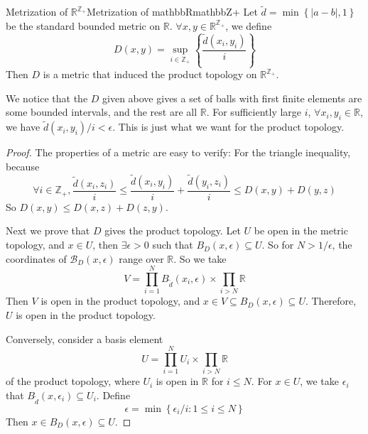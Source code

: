 \documentclass[../main.tex]{subfiles}
\begin{document}
\begin{theorem}{Metrization of $\mathbb{R}^{\mathbb{Z}_+}$}{Metrization of mathbbRmathbbZ+}
Let $\tilde{d} = \min \left\{ |a-b|,1 \right\}$ be the standard bounded metric on $\mathbb{R}$. $\forall x,y\in \mathbb{R}^{\mathbb{Z}_+}$, we define
\begin{equation*}
D(x,y) = \sup_{i\in \mathbb{Z}_+} \left\{ \frac{\tilde{d}(x_i,y_i)}{i} \right\}
\end{equation*}
Then $D$ is a metric that induced the product topology on $\mathbb{R}^{\mathbb{Z}_+}$.
\end{theorem}
We notice that the $D$ given above gives a set of balls with first finite elements are some bounded intervals, and the rest are all $\mathbb{R}$. For sufficiently large $i$, $\forall x_i,y_i\in \mathbb{R}$, we have $\tilde{d}(x_i,y_i) / i < \epsilon$. This is just what we want for the product topology.
\begin{proof}
The properties of a metric are easy to verify: For the triangle inequality, because
\begin{equation*}
	\forall i\in \mathbb{Z}_+, \frac{\tilde{d}(x_i,z_i)}{i} \leq \frac{\tilde{d}(x_i,y_i)}{i} + \frac{\tilde{d}(y_i,z_i)}{i} \leq D(x,y) + D(y,z)
\end{equation*}
So $D(x,y) \leq D(x,z) + D(z,y)$.

Next we prove that $D$ gives the product topology. Let $U$ be open in the metric topology, and $x\in U$, then $\exists \epsilon>0$ such that $B_D(x,\epsilon) \subseteq U$. So for $N > 1 / \epsilon$, the coordinates of $\mathcal{B}_D(x,\epsilon)$ range over $\mathbb{R}$. So we take
\begin{equation*}
	V = \prod_{i=1}^{N} B_{\tilde{d}}(x_i,\epsilon) \times \prod_{i>N} \mathbb{R}
\end{equation*}
Then $V$ is open in the product topology, and $x\in V \subseteq B_D(x,\epsilon) \subseteq U$. Therefore, $U$ is open in the product topology.

Conversely, consider a basis element
\begin{equation*}
	U = \prod_{i=1}^{N} U_i \times \prod_{i>N} \mathbb{R}
\end{equation*}
of the product topology, where $U_i$ is open in $\mathbb{R}$ for $i\leq N$. For $x\in U$, we take $\epsilon_i$ that $B_{\tilde{d}}(x,\epsilon_i) \subseteq U_i$. Define
\begin{equation*}
\epsilon = \min \left\{ \epsilon_i / i : 1\leq i \leq N \right\}
\end{equation*}
Then $x\in B_D(x,\epsilon) \subseteq U$.
\end{proof}
\end{document}
